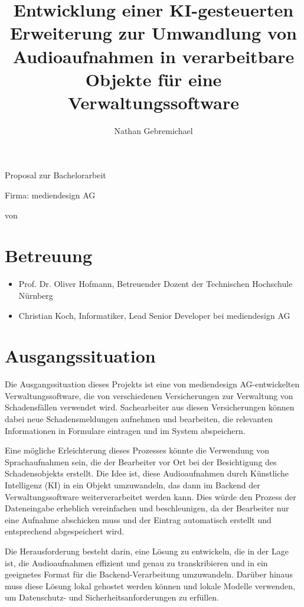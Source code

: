 \documentclass[12pt,a4paper,parskip=full]{scrartcl}
\title{Entwicklung einer KI-gesteuerten Erweiterung zur Umwandlung von Audioaufnahmen in verarbeitbare Objekte für eine Verwaltungssoftware}
\author{Nathan Gebremichael}
\date{}
\newcommand{\firma}{mediendesign AG}
\begin{document}
\makeatletter

{
    \centering
    {\Large Proposal zur Bachelorarbeit \par}
    \vspace*{1cm}
    {\LARGE \@title \par}
    \vspace*{1cm}
    {\large Firma: \firma \par}
    \vspace*{0.5cm}
    {\small von \@author \par}
    }

\section*{Betreuung}
\begin{itemize}
    \item Prof. Dr. Oliver Hofmann, Betreuender Dozent der Technischen Hochschule Nürnberg
    \item Christian Koch, Informatiker, Lead Senior Developer bei mediendesign AG
\end{itemize}

\section*{Ausgangssituation}
Die Ausgangssituation dieses Projekts ist eine von mediendesign AG-entwickelten Verwaltungssoftware, die von verschiedenen Versicherungen zur Verwaltung von Schadensfällen verwendet wird.
Sachearbeiter aus diesen Versicherungen können dabei neue Schadensmeldungen aufnehmen und bearbeiten, die relevanten Informationen in Formulare eintragen und im System abspeichern.

Eine mögliche Erleichterung dieses Prozesses könnte die Verwendung von Sprachaufnahmen sein, die der Bearbeiter vor Ort bei der Besichtigung des Schadensobjekts erstellt.
Die Idee ist, diese Audioaufnahmen durch Künstliche Intelligenz (KI) in ein Objekt umzuwandeln, das dann im Backend der Verwaltungssoftware weiterverarbeitet werden kann.
Dies würde den Prozess der Dateneingabe erheblich vereinfachen und beschleunigen, da der Bearbeiter nur eine Aufnahme abschicken muss und der Eintrag automatisch erstellt und entsprechend abgespeichert wird.

Die Herausforderung besteht darin, eine Lösung zu entwickeln, die in der Lage ist, die Audioaufnahmen effizient und genau zu transkribieren und in ein geeignetes Format für die Backend-Verarbeitung umzuwandeln.
Darüber hinaus muss diese Lösung lokal gehostet werden können und lokale Modelle verwenden, um Datenschutz- und Sicherheitsanforderungen zu erfüllen.
\end{document}
